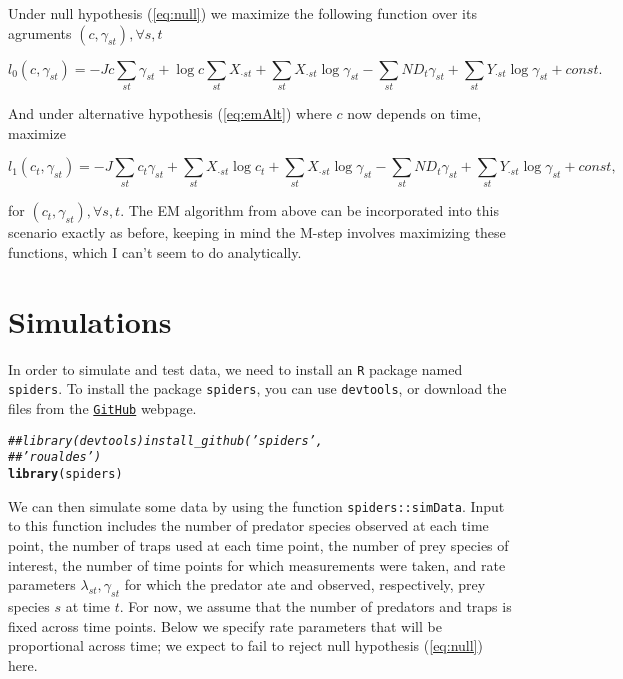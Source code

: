 \documentclass[12pt]{article}\usepackage[]{graphicx}\usepackage[]{color}
\makeatletter
\newcommand{\hlcom}[1]{\textcolor[rgb]{0.678,0.584,0.686}{\textit{#1}}}%
\newcommand{\hlstd}[1]{\textcolor[rgb]{0.345,0.345,0.345}{#1}}%
\newcommand{\hlkwd}[1]{\textcolor[rgb]{0.737,0.353,0.396}{\textbf{#1}}}%
\newenvironment{kframe}{%
 \def\at@end@of@kframe{}%
 \ifinner\ifhmode%
  \def\at@end@of@kframe{\end{minipage}}%
  \begin{minipage}{\columnwidth}%
 \fi\fi%
 \def\FrameCommand##1{\hskip\@totalleftmargin \hskip-\fboxsep
 \colorbox{shadecolor}{##1}\hskip-\fboxsep
     \hskip-\linewidth \hskip-\@totalleftmargin \hskip\columnwidth}%
 \MakeFramed {\advance\hsize-\width
   \@totalleftmargin\z@ \linewidth\hsize
   \@setminipage}}%
 {\par\unskip\endMakeFramed%
 \at@end@of@kframe}
\newenvironment{knitrout}{}{} %
\makeatother
\begin{document}
\noindent Under null hypothesis (\ref{eq:null}) we maximize the following function over its agruments $(c,\gamma_{st}), \forall s,t$

\begin{equation*}
  l_0(c, \gamma_{st}) = -Jc\sum_{st}\gamma_{st} + \log{c}\sum_{st}X_{\cdot st} + \sum_{st}X_{\cdot st} \log{\gamma_{st}} - \sum_{st}ND_t \gamma_{st} + \sum_{st} Y_{\cdot st} \log{\gamma_{st}} + const.
\end{equation*}

And under alternative hypothesis (\ref{eq:emAlt}) where $c$ now depends on time, maximize

\begin{equation*}
  l_1(c_t, \gamma_{st}) = -J\sum_{st}c_t \gamma_{st} + \sum_{st}X_{\cdot st}\log{c_t} + \sum_{st}X_{\cdot st} \log{\gamma_{st}} - \sum_{st}ND_t \gamma_{st} + \sum_{st} Y_{\cdot st} \log{\gamma_{st}} + const,
\end{equation*}

\noindent for $(c_t, \gamma_{st}), \forall s,t$.  The EM algorithm from above can be incorporated into this scenario exactly as before, keeping in mind the M-step involves maximizing these functions, which I can't seem to do analytically. 


\section{Simulations}

In order to simulate and test data, we need to install an \texttt{R} package named \texttt{spiders}.  To install the package \texttt{spiders}, you can use \texttt{devtools}, or download the files from the \href{https://github.com/roualdes/spiders}{\texttt{GitHub}} webpage.

\begin{knitrout}
\color{fgcolor}\begin{kframe}
\begin{alltt}
\hlcom{## library(devtools) install_github('spiders',}
\hlcom{## 'roualdes')}
\hlkwd{library}\hlstd{(spiders)}
\end{alltt}
\end{kframe}
\end{knitrout}


We can then simulate some data by using the function \texttt{spiders::simData}.  Input to this function includes the number of predator species observed at each time point, the number of traps used at each time point, the number of prey species of interest, the number of time points for which measurements were taken, and rate parameters $\lambda_{st}, \gamma_{st}$ for which the predator ate and observed, respectively, prey species $s$ at time $t$.  For now, we assume that the number of predators and traps is fixed across time points.  Below we specify rate parameters that will be proportional across time; we expect to fail to reject null hypothesis (\ref{eq:null}) here. 
\end{document}
